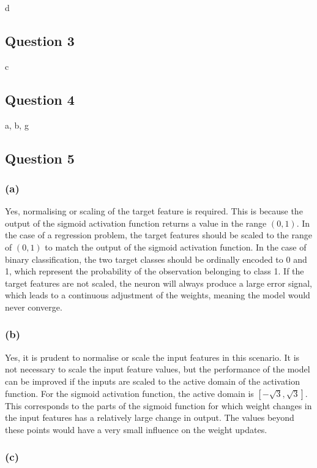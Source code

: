 \documentclass[10pt]{article}
\begin{document}
d

\subsection*{Question 3}

c

\subsection*{Question 4}

a, b, g

\subsection*{Question 5}

\subsubsection*{(a)}

Yes, normalising or scaling of the target feature is required. This is because the output of the sigmoid
activation function returns a value in the range $(0,1)$. In the case of a regression problem, the target features should
be scaled to the range of $(0,1)$ to match the output of the sigmoid activation function. In the case of binary classification,
the two target classes should be ordinally encoded to 0 and 1, which represent the probability of the observation belonging to class 1.
If the target features are not scaled, the neuron will always produce a large error signal, which leads to a continuous adjustment of the
weights, meaning the model would never converge.

\subsubsection*{(b)}

Yes, it is prudent to normalise or scale the input features in this scenario. It is not necessary to scale the input
feature values, but the performance of the model can be improved if the inputs are scaled to the active domain of the
activation function. For the sigmoid activation function, the active domain is $[-\sqrt{3}, \sqrt{3}]$. This corresponds
to the parts of the sigmoid function for which weight changes in the input features has a relatively large change
in output. The values beyond these points would have a very small influence on the weight updates.

\subsubsection*{(c)}
\end{document}
